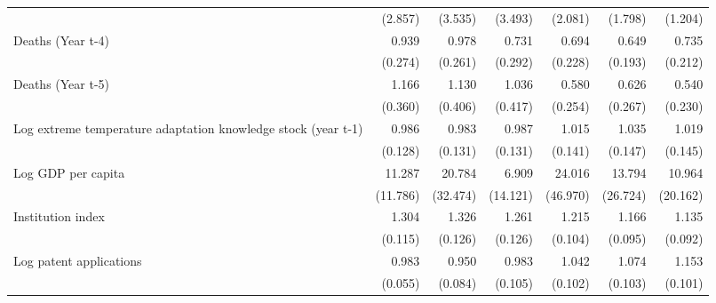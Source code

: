 \begin{table}[htbp]
\begin{tabular}{l*{6}{D{.}{.}{-1}}}
                    &     (2.857)         &     (3.535)         &     (3.493)         &     (2.081)         &     (1.798)         &     (1.204)         \\
\addlinespace
Deaths (Year t-4)   &       0.939         &       0.978         &       0.731         &       0.694         &       0.649         &       0.735         \\
                    &     (0.274)         &     (0.261)         &     (0.292)         &     (0.228)         &     (0.193)         &     (0.212)         \\
\addlinespace
Deaths (Year t-5)   &       1.166         &       1.130         &       1.036         &       0.580         &       0.626         &       0.540         \\
                    &     (0.360)         &     (0.406)         &     (0.417)         &     (0.254)         &     (0.267)         &     (0.230)         \\
\addlinespace
Log extreme temperature adaptation knowledge stock (year t-1)&       0.986         &       0.983         &       0.987         &       1.015         &       1.035         &       1.019         \\
                    &     (0.128)         &     (0.131)         &     (0.131)         &     (0.141)         &     (0.147)         &     (0.145)         \\
\addlinespace
Log GDP per capita  &      11.287\sym{**} &      20.784\sym{*}  &       6.909         &      24.016         &      13.794         &      10.964         \\
                    &    (11.786)         &    (32.474)         &    (14.121)         &    (46.970)         &    (26.724)         &    (20.162)         \\
\addlinespace
Institution index   &       1.304\sym{***}&       1.326\sym{***}&       1.261\sym{**} &       1.215\sym{**} &       1.166\sym{*}  &       1.135         \\
                    &     (0.115)         &     (0.126)         &     (0.126)         &     (0.104)         &     (0.095)         &     (0.092)         \\
\addlinespace
Log patent applications&       0.983         &       0.950         &       0.983         &       1.042         &       1.074         &       1.153         \\
                    &     (0.055)         &     (0.084)         &     (0.105)         &     (0.102)         &     (0.103)         &     (0.101)         \\

\end{tabular}
\end{table}
